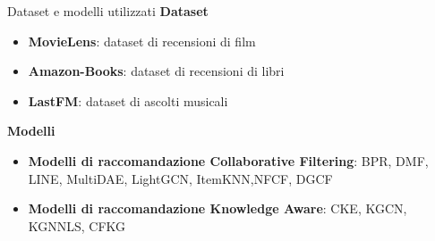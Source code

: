 \begin{frame}{Dataset e modelli utilizzati}
    \textbf{Dataset}
    \begin{itemize}
        \item \textbf{MovieLens}: dataset di recensioni di film
        \item \textbf{Amazon-Books}: dataset di recensioni di libri
        \item \textbf{LastFM}: dataset di ascolti musicali
    \end{itemize}
    \textbf{Modelli}
    \begin{itemize}
        \item \textbf{Modelli di raccomandazione Collaborative Filtering}: BPR, DMF, LINE, MultiDAE, LightGCN, ItemKNN,NFCF, DGCF
        \item \textbf{Modelli di raccomandazione Knowledge Aware}: CKE, KGCN, KGNNLS, CFKG
    \end{itemize}
\end{frame}
